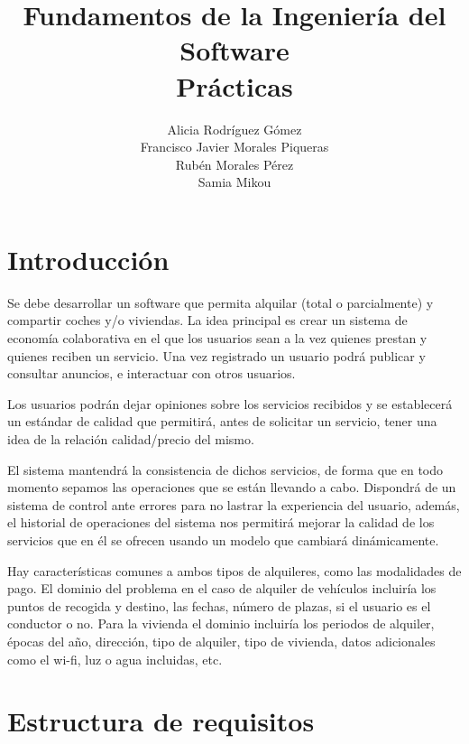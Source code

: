 \documentclass[11pt,spanish]{article} %
\title{Fundamentos de la Ingeniería del Software \\ Prácticas}
\author{Alicia Rodríguez Gómez \\ Francisco Javier Morales Piqueras\\ Rubén Morales Pérez\\ Samia Mikou}
\date{ }
\begin{document}
\maketitle
\tableofcontents %
\newpage
\setlength\parindent{0pt} %


\section{Introducción}
Se debe desarrollar un software que permita alquilar (total o parcialmente) y compartir coches y/o viviendas. 
La idea principal es crear un sistema de economía colaborativa en el que los usuarios sean a la vez quienes prestan y quienes reciben un servicio. 
Una vez registrado un usuario podrá publicar y consultar anuncios, e interactuar con otros usuarios.

Los usuarios podrán dejar opiniones sobre los servicios recibidos y se establecerá un estándar de calidad que permitirá, antes de solicitar un servicio, tener una idea de la relación calidad/precio del mismo.

El sistema mantendrá la consistencia de dichos servicios, de forma que en todo momento sepamos las operaciones que se están llevando a cabo.
Dispondrá de un sistema de control ante errores para no lastrar la experiencia del usuario, además, el historial de operaciones del sistema nos permitirá mejorar la calidad de los servicios que en él se ofrecen usando un modelo que cambiará dinámicamente.

Hay características comunes a ambos tipos de alquileres, como las modalidades de pago.
El dominio del problema en el caso de alquiler de vehículos incluiría los puntos de recogida y destino, las fechas, número de plazas, si el usuario es el conductor o no.
Para la vivienda el dominio incluiría los periodos de alquiler, épocas del año, dirección, tipo de alquiler, tipo de vivienda, datos adicionales como el wi-fi, luz o agua incluidas, etc.


\section{Estructura de requisitos}
\end{document}
